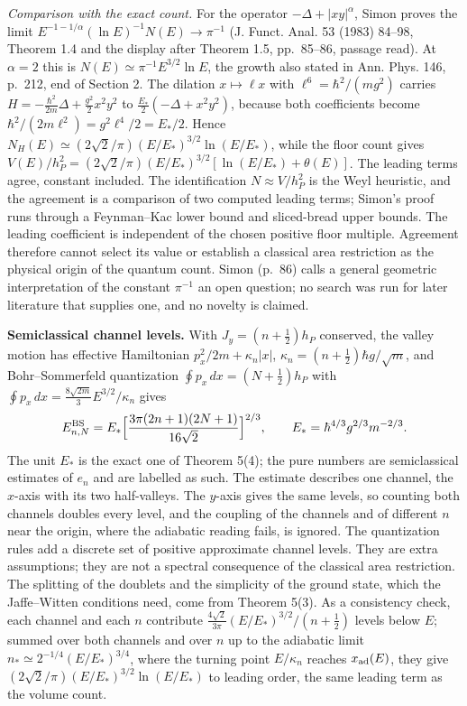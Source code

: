 \documentclass[11pt,a4paper]{article}
\begin{document}
\emph{Comparison with the exact count.} For the operator
\(-\Delta+|xy|^\alpha\), Simon proves the limit
\(E^{-1-1/\alpha}(\ln E)^{-1}N(E)\to\pi^{-1}\) (J. Funct. Anal. 53
(1983) 84--98, Theorem 1.4 and the display after Theorem 1.5,
pp.~85--86, passage read). At \(\alpha=2\) this is
\(N(E)\simeq\pi^{-1}E^{3/2}\ln E\), the growth also stated in Ann. Phys.
146, p.~212, end of Section 2. The dilation \(x\mapsto\ell x\) with
\(\ell^6=\hbar^2/(mg^2)\) carries
\(H=-\frac{\hbar^2}{2m}\Delta+\frac{g^2}{2}x^2y^2\) to
\(\frac{E_*}2(-\Delta+x^2y^2)\), because both coefficients become
\(\hbar^2/(2m\ell^2)=g^2\ell^4/2={E_*}/2\). Hence
\(N_H(E)\simeq(2\sqrt2/\pi)(E/{E_*})^{3/2}\ln(E/{E_*})\), while the
floor count gives
\(V(E)/h_P^2=(2\sqrt2/\pi)(E/{E_*})^{3/2}[\ln(E/{E_*})+\theta(E)]\). The
leading terms agree, constant included. The identification
\(N\approx V/h_P^2\) is the Weyl heuristic, and the agreement is a
comparison of two computed leading terms; Simon's proof runs through a
Feynman--Kac lower bound and sliced-bread upper bounds. The leading
coefficient is independent of the chosen positive floor multiple.
Agreement therefore cannot select its value or establish a classical
area restriction as the physical origin of the quantum count. Simon
(p.~86) calls a general geometric interpretation of the constant
\(\pi^{-1}\) an open question; no search was run for later literature
that supplies one, and no novelty is claimed.

\textbf{Semiclassical channel levels.} With \(J_y=(n+\tfrac12)h_P\)
conserved, the valley motion has effective Hamiltonian
\(p_x^2/2m+\kappa_n|x|\), \(\kappa_n=(n+\tfrac12)\hbar g/\sqrt m\), and
Bohr--Sommerfeld quantization \(\oint p_x\,dx=(N+\tfrac12)h_P\) with
\(\oint p_x\,dx=\tfrac{8\sqrt{2m}}{3}E^{3/2}/\kappa_n\) gives
\[E^{\rm BS}_{n,N}={E_*}\Big[\frac{3\pi(2n+1)(2N+1)}{16\sqrt2}\Big]^{2/3},
\qquad{E_*}=\hbar^{4/3}g^{2/3}m^{-2/3}.\] The unit \({E_*}\) is the
exact one of Theorem 5(4); the pure numbers are semiclassical estimates
of \(e_n\) and are labelled as such. The estimate describes one channel,
the \(x\)-axis with its two half-valleys. The \(y\)-axis gives the same
levels, so counting both channels doubles every level, and the coupling
of the channels and of different \(n\) near the origin, where the
adiabatic reading fails, is ignored. The quantization rules add a
discrete set of positive approximate channel levels. They are extra
assumptions; they are not a spectral consequence of the classical area
restriction. The splitting of the doublets and the simplicity of the
ground state, which the Jaffe--Witten conditions need, come from Theorem
5(3). As a consistency check, each channel and each \(n\) contribute
\(\frac{4\sqrt2}{3\pi}(E/{E_*})^{3/2}/(n+\tfrac12)\) levels below \(E\);
summed over both channels and over \(n\) up to the adiabatic limit
\(n_*\simeq2^{-1/4}(E/{E_*})^{3/4}\), where the turning point
\(E/\kappa_n\) reaches \(x_{\rm ad}(E)\), they give
\((2\sqrt2/\pi)(E/{E_*})^{3/2}\ln(E/{E_*})\) to leading order, the same
leading term as the volume count.
\end{document}
